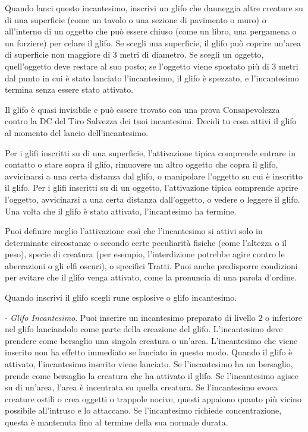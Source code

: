 \begin{multicols}{2}
Quando lanci questo incantesimo, inscrivi un glifo che danneggia altre creature su di una superficie (come un tavolo o una sezione di pavimento o muro) o all'interno di un oggetto che può essere chiuso (come un libro, una pergamena o un forziere) per celare il glifo. Se scegli una superficie, il glifo può coprire un'area di superficie non maggiore di 3 metri di diametro. Se scegli un oggetto, quell'oggetto deve restare al suo posto; se l'oggetto viene spostato più di 3 metri dal punto in cui è stato lanciato l'incantesimo, il glifo è spezzato, e l'incantesimo termina senza essere stato attivato.

Il glifo è quasi invisibile e può essere trovato con una prova Consapevolezza contro la DC del Tiro Salvezza dei tuoi incantesimi. Decidi tu cosa attivi il glifo al momento del lancio dell'incantesimo.

Per i glifi inscritti su di una superficie, l'attivazione tipica comprende entrare in contatto o stare sopra il glifo, rimuovere un altro oggetto che copra il glifo, avvicinarsi a una certa distanza dal glifo, o manipolare l'oggetto su cui è inscritto il glifo. Per i glifi inscritti su di un oggetto, l'attivazione tipica comprende aprire l'oggetto, avvicinarsi a una certa distanza dall'oggetto, o vedere o leggere il glifo. Una volta che il glifo è stato attivato, l'incantesimo ha termine.

Puoi definire meglio l'attivazione così che l'incantesimo si attivi solo in determinate circostanze o secondo certe peculiarità fisiche (come l'altezza o il peso), specie di creatura (per esempio, l'interdizione potrebbe agire contro le aberrazioni o gli elfi oscuri), o specifici Tratti. Puoi anche predisporre condizioni per evitare che il glifo venga attivato, come la pronuncia di una parola d'ordine.

Quando inscrivi il glifo scegli rune esplosive o glifo incantesimo.

\medskip

- \emph{Glifo Incantesimo}. Puoi inserire un incantesimo preparato di livello 2 o inferiore nel glifo lanciandolo come parte della creazione del glifo. L'incantesimo deve prendere come bersaglio una singola creatura o un'area. L'incantesimo che viene inserito non ha effetto immediato se lanciato in questo modo. Quando il glifo è attivato, l'incantesimo inserito viene lanciato. Se l'incantesimo ha un bersaglio, prende come bersaglio la creatura che ha attivato il glifo. Se l'incantesimo agisce su di un'area, l'area è incentrata su quella creatura. Se l'incantesimo evoca creature ostili o crea oggetti o trappole nocive, questi appaiono quanto più vicino possibile all'intruso e lo attaccano. Se l'incantesimo richiede concentrazione, questa è mantenuta fino al termine della sua normale durata.


\end{multicols}
